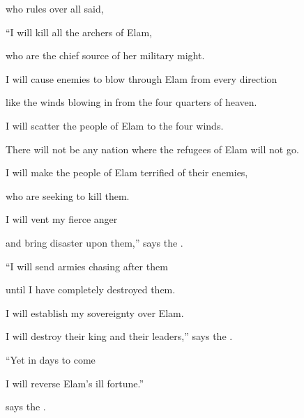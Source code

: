 {{}
who rules over all
said,
\par }{\Q “I
will kill
all the archers
of Elam,
\par }{\Q who are the chief source
of her military might.
\par }{\Q {}I will cause
enemies to blow through Elam
from every direction
\par }{\Q like the winds
blowing in from the four
quarters
of heaven.
\par }{\Q I will scatter
the people
of Elam to the four
winds.
\par }{\Q There will not
be
any nation
where
the refugees
of Elam
will not
go.
\par }{\Q {}I will make the
people of Elam
terrified
of their enemies,
\par }{\Q who are seeking
to kill
them.
\par }{\Q I will vent my
fierce
anger
\par }{\Q and bring
disaster
upon them,”
says
the {}.

\par }{\Q “I will send
armies chasing
after them

\par }{\Q until
I have completely destroyed them.
\par }{\Q {}I will establish
my sovereignty
over Elam.
\par }{\Q I will destroy
their king
and their leaders,”
says
the {}.
\par }{\Q {}“Yet in days
to come
\par }{\Q I will reverse
Elam’s
ill fortune.”
\par }{\Q says
the {}.

\par }
